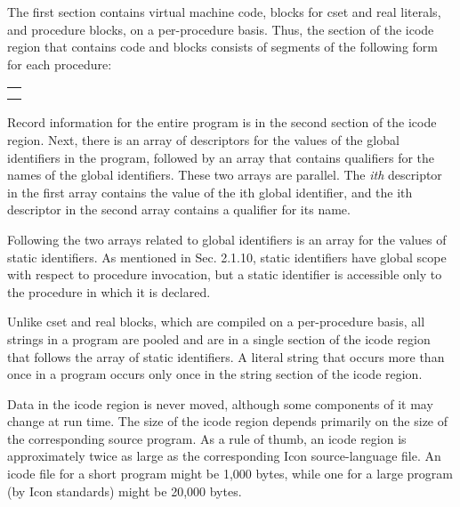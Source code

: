 The first section contains virtual machine code, blocks for cset and
real literals, and procedure blocks, on a per-procedure basis. Thus,
the section of the icode region that contains code and blocks consists
of segments of the following form for each procedure:

\begin{center}
\tabletail{}
\tablelasttail{}
\begin{xtabular}{|m{2.2858598in}|}
\hline
\centering{}\\\hline
\centering{}\\\hline
\centering{}\\\hline
\end{xtabular}
\end{center}

Record information for the entire program is in the second section of
the icode region. Next, there is an array of descriptors for the
values of the global identifiers in the program, followed by an array
that contains qualifiers for the names of the global
identifiers. These two arrays are parallel. The \textit{ith}
descriptor in the first array contains the value of the ith global
identifier, and the ith descriptor in the second array contains a
qualifier for its name.

Following the two arrays related to global identifiers is an array for
the values of static identifiers. As mentioned in Sec. 2.1.10, static
identifiers have global scope with respect to procedure invocation,
but a static identifier is accessible only to the procedure in which
it is declared.

Unlike cset and real blocks, which are compiled on a per-procedure
basis, all strings in a program are pooled and are in a single section
of the icode region that follows the array of static identifiers. A
literal string that occurs more than once in a program occurs only
once in the string section of the icode region.

Data in the icode region is never moved, although some components of
it may change at run time. The size of the icode region depends
primarily on the size of the corresponding source program. As a rule
of thumb, an icode region is approximately twice as large as the
corresponding Icon source-language file. An icode file for a short
program might be 1,000 bytes, while one for a large program (by Icon
standards) might be 20,000 bytes.

